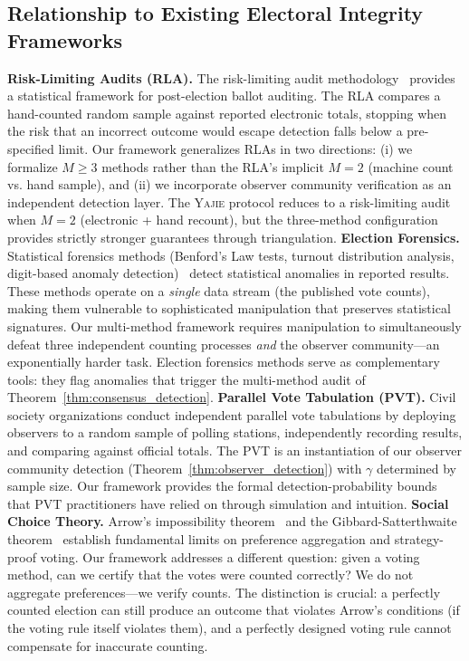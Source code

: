 \documentclass[11pt,a4paper]{article}
\theoremstyle{definition}
\newcommand{\Yajie}{\textsc{Yajie}}
\begin{document}
\subsection{Relationship to Existing Electoral Integrity Frameworks}
\textbf{Risk-Limiting Audits (RLA).} The risk-limiting audit methodology~\cite{Lindeman2012RLA} provides a statistical framework for post-election ballot auditing. The RLA compares a hand-counted random sample against reported electronic totals, stopping when the risk that an incorrect outcome would escape detection falls below a pre-specified limit. Our framework generalizes RLAs in two directions: (i) we formalize $M \geq 3$ methods rather than the RLA's implicit $M = 2$ (machine count vs. hand sample), and (ii) we incorporate observer community verification as an independent detection layer. The \Yajie{} protocol reduces to a risk-limiting audit when $M = 2$ (electronic + hand recount), but the three-method configuration provides strictly stronger guarantees through triangulation.
\textbf{Election Forensics.} Statistical forensics methods (Benford's Law tests, turnout distribution analysis, digit-based anomaly detection)~\cite{Mebane2008,BeberScacco2012} detect statistical anomalies in reported results. These methods operate on a \textit{single} data stream (the published vote counts), making them vulnerable to sophisticated manipulation that preserves statistical signatures. Our multi-method framework requires manipulation to simultaneously defeat three independent counting processes \textit{and} the observer community---an exponentially harder task. Election forensics methods serve as complementary tools: they flag anomalies that trigger the multi-method audit of Theorem~\ref{thm:consensus_detection}.
\textbf{Parallel Vote Tabulation (PVT).} Civil society organizations conduct independent parallel vote tabulations by deploying observers to a random sample of polling stations, independently recording results, and comparing against official totals. The PVT is an instantiation of our observer community detection (Theorem~\ref{thm:observer_detection}) with $\gamma$ determined by sample size. Our framework provides the formal detection-probability bounds that PVT practitioners have relied on through simulation and intuition.
\textbf{Social Choice Theory.} Arrow's impossibility theorem~\cite{Arrow1951} and the Gibbard-Satterthwaite theorem~\cite{Gibbard1973,Satterthwaite1975} establish fundamental limits on preference aggregation and strategy-proof voting. Our framework addresses a different question: given a voting method, can we certify that the votes were counted correctly? We do not aggregate preferences---we verify counts. The distinction is crucial: a perfectly counted election can still produce an outcome that violates Arrow's conditions (if the voting rule itself violates them), and a perfectly designed voting rule cannot compensate for inaccurate counting.
\end{document}
